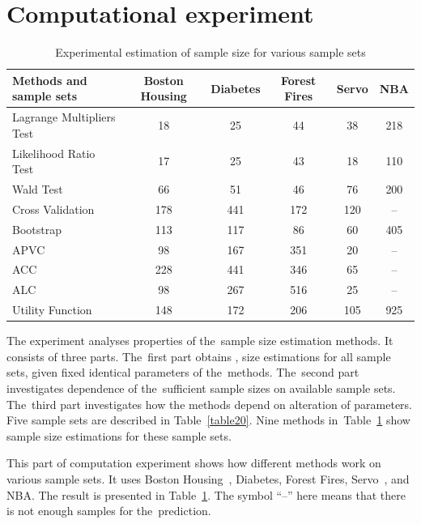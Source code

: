\documentclass[
11pt,%
tightenlines,%
twoside,%
onecolumn,%
nofloats,%
nobibnotes,%
nofootinbib,%
superscriptaddress,%
noshowpacs,%
centertags]%
{revtex4}
\begin{document}
\section{Computational experiment}
\begin{table}[!htp]
\centering
\caption{Experimental estimation of sample size  for various sample sets}
\label{table2}
\begin{tabular}{l|c|c|c|c|c}
\hline
 Methods and sample sets & Boston Housing & Diabetes & Forest Fires & Servo & NBA \\ \hline
Lagrange Multipliers Test & 18 & 25 & 44 & 38 & 218 \\ \hline
Likelihood Ratio Test & 17 & 25 & 43 & 18 & 110 \\ \hline
Wald Test & 66 & 51 & 46 & 76 & 200 \\ \hline
Cross Validation & 178 & 441 & 172 & 120 & -- \\ \hline
Bootstrap & 113 & 117 & 86 & 60 & 405 \\ \hline
APVC & 98 & 167 & 351 & 20 & -- \\ \hline
ACC & 228 & 441 & 346 & 65 & -- \\ \hline
ALC & 98 & 267 & 516 & 25 & -- \\ \hline
Utility Function & 148 & 172 & 206 & 105 & 925 \\ \hline
\end{tabular}
\end{table}

The experiment analyses  properties of the~sample size estimation methods. It consists of three parts. The~first part obtains , size estimations for all sample sets, given fixed identical parameters of the~methods. The~second part investigates dependence of the~sufficient sample sizes on available sample sets. The~third part investigates how the methods depend on alteration of parameters. Five sample sets are described in Table~\ref{table20}. Nine methods in~Table~\ref{table2} show sample size estimations for these sample sets. 
 
This part of computation experiment shows how different methods work on various sample sets. It uses Boston Housing~\cite{boston}, Diabetes, Forest Fires, Servo~\cite{servo}, and NBA.
The result is presented in Table~\ref{table2}. The symbol ``--'' here means that there is not enough samples for the~prediction.
\end{document}
